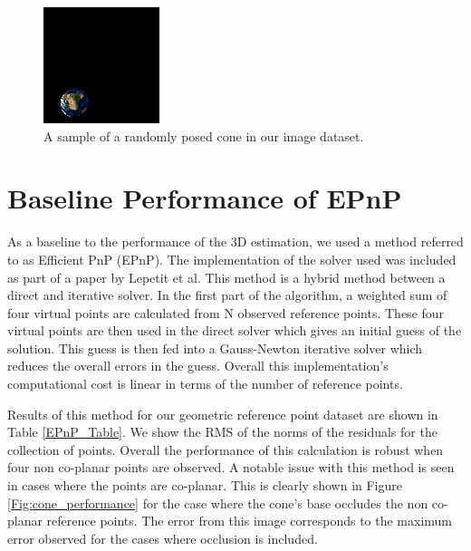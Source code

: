 \documentclass[journal]{IEEEtran}
\begin{document}
\begin{figure}[H]
	\hspace{-10 ex}

	\centering
	\includegraphics[width=.6\linewidth]{sphere_450}

	\caption{A sample of a randomly posed cone in our image dataset.}
	\label{openglSphere}
\end{figure}

\section{Baseline Performance of EPnP}

 As a baseline to the performance of the 3D estimation, we used a method referred to as Efficient PnP (EPnP). The implementation of the solver used was included as part of a paper by Lepetit et al\cite{EPnP}. This method is a hybrid method between a direct and iterative solver. In the first part of the algorithm, a weighted sum of four virtual points are calculated from N observed reference points. These four virtual points are then used in the direct solver which gives an initial guess of the solution. This guess is then fed into a Gauss-Newton iterative solver which reduces the overall errors in the guess. Overall this implementation's computational cost is linear in terms of the number of reference points.
 
 Results of this method for our geometric reference point dataset are shown in Table \ref{EPnP_Table}. We show the RMS of the norms of the residuals for the collection of points. Overall the performance of this calculation is robust when four non co-planar points are observed. A notable issue with this method is seen in cases where the points are co-planar. This is clearly shown in Figure \ref{Fig:cone_performance} for the case where the cone's base occludes the non co-planar reference points. The error from this image corresponds to the maximum error observed for the cases where occlusion is included. 
 
\end{document}
